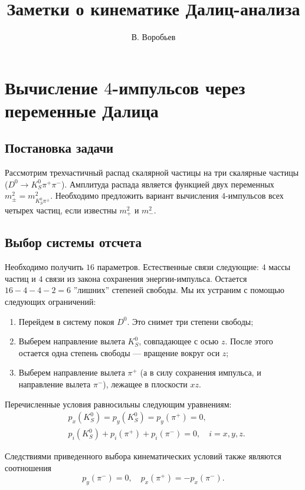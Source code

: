 \documentclass[a4paper,10pt]{article}
\title{Заметки о кинематике Далиц-анализа}
\author{В. Воробьев}
\newcommand{\dnkpp}{\ensuremath{D^0\to K^0_S\pi^+\pi^-}\xspace}
\newcommand{\mpsq}{\ensuremath{m_+^2}\xspace}
\newcommand{\mmsq}{\ensuremath{m_-^2}\xspace}
\begin{document}
\maketitle

\section{Вычисление $4$-импульсов через переменные Далица}
\subsection{Постановка задачи}
Рассмотрим трехчастичный распад скалярной частицы на три скалярные частицы (\dnkpp). Амплитуда распада является функцией двух переменных $m_{\pm}^2=m^2_{K_S^0\pi^{\pm}}$. Необходимо предложить вариант вычисления $4$-импульсов всех четырех частиц, если известны \mpsq и \mmsq.

\subsection{Выбор системы отсчета}
Необходимо получить $16$ параметров. Естественные связи следующие: $4$ массы частиц и $4$ связи из закона сохранения энергии-импульса. Остается $16-4-4-2=6$ ''лишних'' степеней свободы. Мы их устраним с помощью следующих ограничений:
\begin{enumerate}
 \item Перейдем в систему покоя $D^0$. Это снимет три степени свободы;
 \item Выберем направление вылета $K_S^0$, совпадающее с осью $z$. После этого остается одна степень свободы --- вращение вокруг оси $z$;
 \item Выберем направление вылета $\pi^+$ (а в силу сохранения импульса, и направление вылета $\pi^-$), лежащее в плоскости $xz$.
\end{enumerate}

Перечисленные условия равносильны следующим уравнениям:
\begin{equation}
\begin{split}
 &p_x(K_S^0) = p_y(K_S^0) = p_y(\pi^{+}) = 0,\\
 &p_i(K_S^0) + p_i(\pi^{+}) + p_i(\pi^{-}) = 0,\quad i = x,y,z.
\end{split}
\end{equation}

Следствиями приведенного выбора кинематических условий также являются соотношения
\begin{equation}
 p_y(\pi^-) = 0,\quad p_x(\pi^+) = -p_x(\pi^-).
\end{equation}
\end{document}
